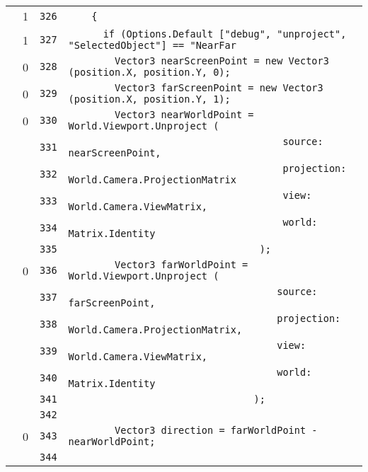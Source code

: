 \documentclass[a4paper,10pt]{article}
\begin{document}
\begin{longtable}[l]{lrrl}
\cellcolor{green} & 1 & \verb~326~ & \verb~    {~\\
\cellcolor{green} & 1 & \verb~327~ & \verb~      if (Options.Default ["debug", "unproject", "SelectedObject"] == "NearFar~\\
\cellcolor{red} & 0 & \verb~328~ & \verb~        Vector3 nearScreenPoint = new Vector3 (position.X, position.Y, 0);~\\
\cellcolor{red} & 0 & \verb~329~ & \verb~        Vector3 farScreenPoint = new Vector3 (position.X, position.Y, 1);~\\
\cellcolor{red} & 0 & \verb~330~ & \verb~        Vector3 nearWorldPoint = World.Viewport.Unproject (~\\
\cellcolor{gray} &  & \verb~331~ & \verb~                                     source: nearScreenPoint,~\\
\cellcolor{gray} &  & \verb~332~ & \verb~                                     projection: World.Camera.ProjectionMatrix~\\
\cellcolor{gray} &  & \verb~333~ & \verb~                                     view: World.Camera.ViewMatrix,~\\
\cellcolor{gray} &  & \verb~334~ & \verb~                                     world: Matrix.Identity~\\
\cellcolor{gray} &  & \verb~335~ & \verb~                                 );~\\
\cellcolor{red} & 0 & \verb~336~ & \verb~        Vector3 farWorldPoint = World.Viewport.Unproject (~\\
\cellcolor{gray} &  & \verb~337~ & \verb~                                    source: farScreenPoint,~\\
\cellcolor{gray} &  & \verb~338~ & \verb~                                    projection: World.Camera.ProjectionMatrix,~\\
\cellcolor{gray} &  & \verb~339~ & \verb~                                    view: World.Camera.ViewMatrix,~\\
\cellcolor{gray} &  & \verb~340~ & \verb~                                    world: Matrix.Identity~\\
\cellcolor{gray} &  & \verb~341~ & \verb~                                );~\\
\cellcolor{gray} &  & \verb~342~ & \verb~~\\
\cellcolor{red} & 0 & \verb~343~ & \verb~        Vector3 direction = farWorldPoint - nearWorldPoint;~\\
\cellcolor{gray} &  & \verb~344~ & \verb~~\\

\end{longtable}
\end{document}
